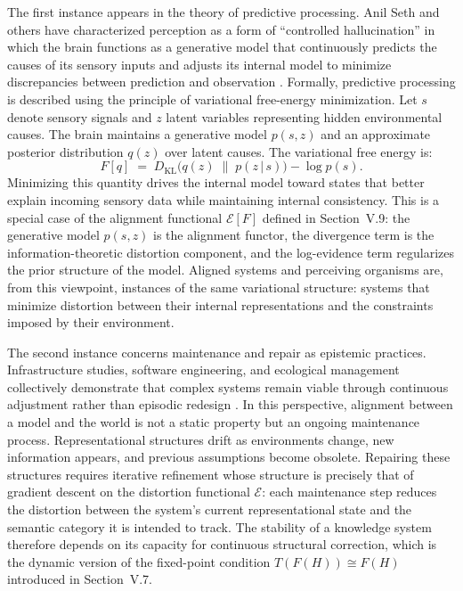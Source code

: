 \documentclass[12pt]{article}
\theoremstyle{definition}
\begin{document}
The first instance appears in the theory of predictive processing. Anil Seth and
others have characterized perception as a form of ``controlled hallucination''
in which the brain functions as a generative model that continuously predicts
the causes of its sensory inputs and adjusts its internal model to minimize
discrepancies between prediction and observation
\citep{seth2021being,friston2010}. Formally, predictive processing is described
using the principle of variational free-energy minimization. Let $s$ denote
sensory signals and $z$ latent variables representing hidden environmental
causes. The brain maintains a generative model $p(s, z)$ and an approximate
posterior distribution $q(z)$ over latent causes. The variational free energy is:
\begin{equation}
  F[q]
  \;=\;
  D_{\mathrm{KL}}\bigl(q(z) \;\|\; p(z\,|\,s)\bigr) - \log p(s).
\end{equation}
Minimizing this quantity drives the internal model toward states that better
explain incoming sensory data while maintaining internal consistency. This is a
special case of the alignment functional $\mathcal{E}[F]$ defined in Section~V.9:
the generative model $p(s, z)$ is the alignment functor, the divergence term
is the information-theoretic distortion component, and the log-evidence term
regularizes the prior structure of the model. Aligned systems and perceiving
organisms are, from this viewpoint, instances of the same variational structure:
systems that minimize distortion between their internal representations and the
constraints imposed by their environment.

The second instance concerns maintenance and repair as epistemic practices.
Infrastructure studies, software engineering, and ecological management
collectively demonstrate that complex systems remain viable through continuous
adjustment rather than episodic redesign \citep{star1999ethnography}. In this
perspective, alignment between a model and the world is not a static property
but an ongoing maintenance process. Representational structures drift as
environments change, new information appears, and previous assumptions become
obsolete. Repairing these structures requires iterative refinement whose
structure is precisely that of gradient descent on the distortion functional
$\mathcal{E}$: each maintenance step reduces the distortion between the system's
current representational state and the semantic category it is intended to
track. The stability of a knowledge system therefore depends on its capacity for
continuous structural correction, which is the dynamic version of the
fixed-point condition $T(F(H)) \cong F(H)$ introduced in Section~V.7.
\end{document}
